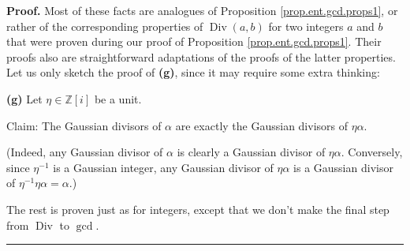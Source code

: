 \documentclass[numbers=enddot,12pt,final,onecolumn,notitlepage]{scrartcl}%
\numberwithin{exer}{subsection}
\theoremstyle{definition}
\newenvironment{proof}[1][Proof]{\noindent\textbf{#1.} }{\ \rule{0.5em}{0.5em}}
\begin{document}
\begin{proof}
Most of these facts are analogues of Proposition \ref{prop.ent.gcd.props1}, or
rather of the corresponding properties of $\operatorname*{Div}\left(
a,b\right)  $ for two integers $a$ and $b$ that were proven during our proof
of Proposition \ref{prop.ent.gcd.props1}. Their proofs also are
straightforward adaptations of the proofs of the latter properties. Let us
only sketch the proof of \textbf{(g)}, since it may require some extra thinking:

\textbf{(g)} Let $\eta\in\mathbb{Z}\left[  i\right]  $ be a unit.

Claim: The Gaussian divisors of $\alpha$ are exactly the Gaussian divisors of
$\eta\alpha$.

(Indeed, any Gaussian divisor of $\alpha$ is clearly a Gaussian divisor of
$\eta\alpha$. Conversely, since $\eta^{-1}$ is a Gaussian integer, any
Gaussian divisor of $\eta\alpha$ is a Gaussian divisor of $\eta^{-1}\eta
\alpha=\alpha$.)

The rest is proven just as for integers, except that we don't make the final
step from $\operatorname*{Div}$ to $\gcd$.
\end{proof}
\end{document}
